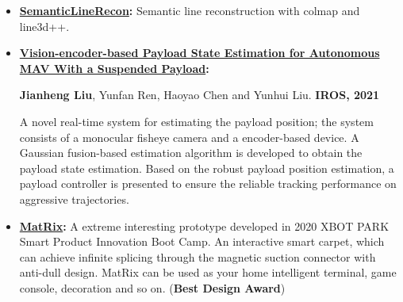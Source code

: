 \documentclass[11pt,a4paper,sans]{moderncv}        %
\begin{document}
{\begin{itemize}
\item \textbf{\href{https://github.com/jianhengLiu/SV-SLAM}{SemanticLineRecon}:} Semantic line reconstruction with colmap and line3d++.


\item \textbf{\href{https://github.com/jianhengLiu/Vision-encoder-based-Payload-State-Estimator}{Vision-encoder-based Payload State Estimation for Autonomous MAV With a Suspended Payload}:} 

\textbf{Jianheng Liu}, Yunfan Ren, Haoyao Chen and Yunhui Liu. \textbf{IROS, 2021}

A novel real-time system for estimating the payload position; the system consists of a monocular fisheye camera and a encoder-based device. A Gaussian fusion-based estimation algorithm is developed to obtain the payload state estimation. Based on the robust payload position estimation, a payload controller is presented to ensure the reliable tracking performance on aggressive trajectories.


\item \textbf{\href{https://www.bilibili.com/video/BV1gb4y127by?share_source=copy_web}{MatRix}:} A extreme interesting prototype developed in 2020 XBOT PARK Smart Product Innovation Boot Camp. An interactive smart carpet, which can achieve infinite splicing through the magnetic suction connector with anti-dull design. MatRix can be used as your home intelligent terminal, game console, decoration and so on. (\textbf{Best Design Award})




\end{itemize}}
\end{document}
